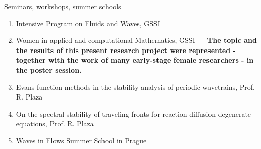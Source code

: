 \documentclass{beamer}
\begin{document}
\begin{frame}{Seminars, workshops, summer schools}

  \begin{enumerate}
    \item Intensive Program on Fluids and Waves, GSSI
    \item Women in applied and computational Mathematics, GSSI --- \textbf{The topic and the results of this present research project were represented - together with the work of many early-stage female researchers - in the poster session.}
    \item Evans function methods in the stability analysis of periodic wavetrains, Prof. R. Plaza
    \item On the spectral stability of traveling fronts for reaction diffusion-degenerate equations, Prof. R. Plaza
    \item Waves in Flows Summer School in Prague
  \end{enumerate}
\end{frame}
\end{document}
